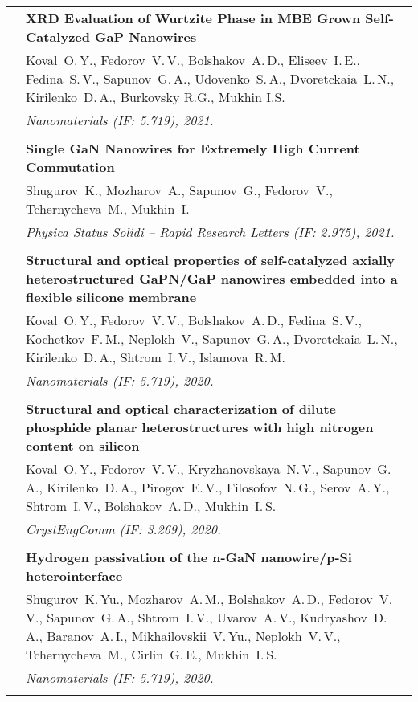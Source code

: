 \documentclass[letterpaper, 11pt]{article}
\begin{document}
\begin{longtable}{p{1.3in}p{4.8in}}
        & \textbf{XRD Evaluation of Wurtzite Phase in MBE Grown Self-Catalyzed
        GaP Nanowires} \\
        & Koval~O.\,Y., Fedorov~V.\,V., Bolshakov~A.\,D., Eliseev~I.\,E.,
        Fedina~S.\,V., Sapunov~G.\,A., Udovenko~S.\,A., Dvoretckaia~L.\,N.,
        Kirilenko~D.\,A., Burkovsky R.G., Mukhin I.S. \\
        & \textit{Nanomaterials (IF: 5.719), 2021.}\\
		& \\

        & \textbf{Single GaN Nanowires for Extremely High Current Commutation}
        \\
        & Shugurov~K., Mozharov~A., Sapunov~G., Fedorov~V., Tchernycheva~M.,
        Mukhin~I. \\
        & \textit{Physica Status Solidi -- Rapid Research Letters (IF: 2.975), 2021.}\\
		& \\

        & \textbf{Structural and optical properties of self-catalyzed axially
        heterostructured GaPN/GaP nanowires embedded into a flexible silicone
        membrane} \\
        & Koval~O.\,Y., Fedorov~V.\,V., Bolshakov~A.\,D., Fedina~S.\,V.,
        Kochetkov~F.\,M., Neplokh~V., Sapunov~G.\,A., Dvoretckaia~L.\,N.,
        Kirilenko~D.\,A., Shtrom~I.\,V., Islamova~R.\,M. \\
        & \textit{Nanomaterials (IF: 5.719), 2020.}\\
		& \\
		
        & \textbf{Structural and optical characterization of dilute phosphide
        planar heterostructures with high nitrogen content on silicon} \\
        & Koval~O.\,Y., Fedorov~V.\,V., Kryzhanovskaya~N.\,V., Sapunov~G.\,A.,
        Kirilenko~D.\,A., Pirogov~E.\,V., Filosofov~N.\,G., Serov~A.\,Y.,
        Shtrom~I.\,V., Bolshakov~A.\,D., Mukhin~I.\,S. \\
        & \textit{CrystEngComm (IF: 3.269), 2020.}\\
		& \\
		
        & \textbf{Hydrogen passivation of the n-GaN nanowire/p-Si
        heterointerface} \\
        & Shugurov~K.\,Yu., Mozharov~A.\,M., Bolshakov~A.\,D., Fedorov~V.\,V.,
        Sapunov~G.\,A., Shtrom~I.\,V., Uvarov~A.\,V., Kudryashov~D.\,A.,
        Baranov~A.\,I., Mikhailovskii~V.\,Yu., Neplokh~V.\,V., Tchernycheva~M.,
        Cirlin~G.\,E., Mukhin~I.\,S. \\
        & \textit{Nanomaterials (IF: 5.719), 2020.}\\
		& \\
		

\end{longtable}
\end{document}
